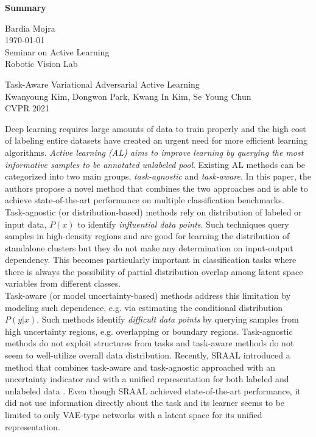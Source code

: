 \documentclass[12pt]{article}
\begin{document}
\begin{center}
\textbf{Summary}\\
\end{center}

\noindent
Bardia Mojra\\
\today\\
Seminar on Active Learning\\
Robotic Vision Lab\\
\begin{center}
{\large Task-Aware Variational Adversarial Active Learning\\}
  {\small Kwanyoung Kim, Dongwon Park, Kwang In Kim, Se Young Chun}\\
  {\small CVPR 2021}\\
\end{center}

Deep learning requires large amounts of data to train properly and the high
cost of
labeling entire datasets have created an urgent need for more efficient
learning algorithms. \textit{Active learning (AL) aims to improve learning by
querying the most informative samples to be annotated unlabeled pool}.
Existing AL methods can be categorized into two main groups,
\textit{task-agnostic} and \textit{task-aware}. In this paper, the authors
propose a novel method that combines the two approaches and is able to achieve
state-of-the-art performance on multiple classification benchmarks.\\

Task-agnostic (or distribution-based) methods rely on distribution of labeled
or input data, \(P(x)\) to identify \textit{influential data points}. Such techniques
query samples in high-density regions and are good for learning the distribution of
standalone clusters but they do not make any determination on input-output
dependency. This becomes particularly important in classification
tasks where there is always the possibility of partial distribution overlap
among latent space variables from different classes.\\

Task-aware (or model uncertainty-based) methods address this limitation by
modeling such dependence,
e.g. via estimating the conditional distribution \(P(y|x)\). Such methods
identify \textit{difficult data points} by querying samples from high uncertainty
regions, e.g. overlapping or boundary regions.
Task-agnostic methods do not exploit structures from tasks and task-aware
methods do not seem to well-utilize overall data distribution. Recently,
SRAAL introduced a method that combines task-aware and
task-agnostic approached with an uncertainty indicator and with a unified
representation for both labeled and unlabeled data \cite{SRAAL}.
Even though SRAAL achieved state-of-the-art performance, it did not use
information directly about the task \cite{LearningLoss} and its learner
seems to be limited to only VAE-type networks with a latent space for its
unified representation.\\
\end{document}
